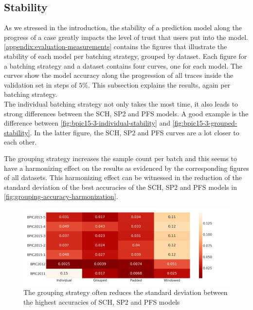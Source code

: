 \subsection*{Stability}
As we stressed in the introduction, the stability of a prediction model along the progress of a case greatly impacts the level of trust that users put into the model. \autoref{appendix:evaluation-measurements} contains the figures that illustrate the stability of each model per batching strategy, grouped by dataset. Each figure for a batching strategy and a dataset contains four curves, one for each model. The curves show the model accuracy along the progression of all traces inside the validation set in steps of $5\%$. This subsection explains the results, again per batching strategy.\\

The individual batching strategy not only takes the most time, it also leads to strong differences between the SCH, SP2 and PFS models. A good example is the difference between \autoref{fig:bpic15-3-individual-stability} and \autoref{fig:bpic15-3-grouped-stability}. In the latter figure, the SCH, SP2 and PFS curves are a lot closer to each other.

The grouping strategy increases the sample count per batch and this seems to have a harmonizing effect on the results as evidenced by the corresponding figures of all datasets. This harmonizing effect can be witnessed in the reduction of the standard deviation of the best accuracies of the SCH, SP2 and PFS models in \autoref{fig:grouping-accuracy-harmonization}.

\begin{figure}
    \centering
    \includegraphics[width=\textwidth]{gfx/grouping-accuracy-harmonization.png}
    \caption[The batching strategies harmonizes top accuracies]{The grouping strategy often reduces the standard deviation between the highest accuracies of SCH, SP2 and PFS models}
    \label{fig:grouping-accuracy-harmonization}
\end{figure}

